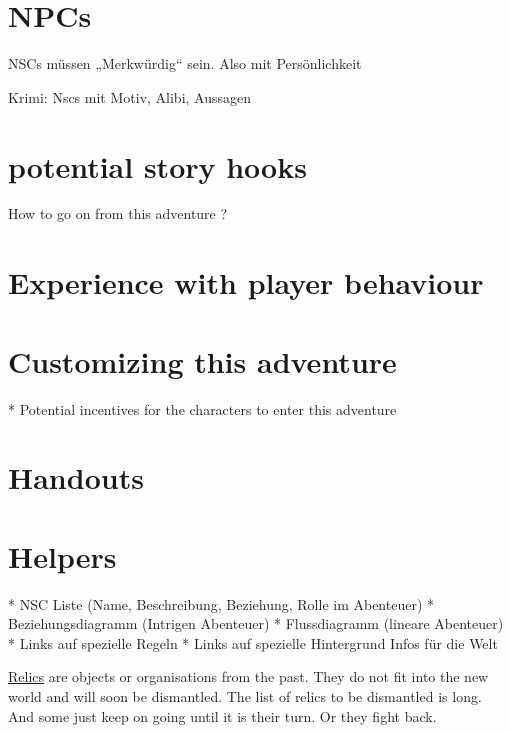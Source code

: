 \section{NPCs}

NSCs müssen „Merkwürdig“ sein. Also mit Persönlichkeit

Krimi: Nscs mit Motiv, Alibi, Aussagen


\section{potential story hooks}

How to go on from this adventure ?

\section{Experience with player behaviour}

\section{Customizing this adventure}

* Potential incentives for the characters to enter this adventure


\section{Handouts}

\section{Helpers}

* NSC Liste (Name, Beschreibung, Beziehung, Rolle im Abenteuer)
* Beziehungsdiagramm (Intrigen Abenteuer)
* Flussdiagramm (lineare Abenteuer)
* Links auf spezielle Regeln
* Links auf spezielle Hintergrund Infos für die Welt



\begin{sidebarBox}[title=Relics]
\hyperref[sec:Relic]{Relics} are objects or organisations from the past. They do not fit into the new world and will soon be dismantled. The list of relics to be dismantled is long. And some just keep on going until it is their turn. Or they fight back.
\end{sidebarBox}

